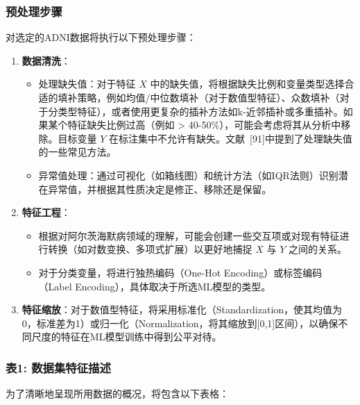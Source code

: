 \documentclass[12pt,a4paper]{article}
\begin{document}
\subsubsection{预处理步骤}
\label{sec:preprocessing_steps}
对选定的ADNI数据将执行以下预处理步骤：
\begin{enumerate}
    \item \textbf{数据清洗}：
    \begin{itemize}
        \item 处理缺失值：对于特征 $X$ 中的缺失值，将根据缺失比例和变量类型选择合适的填补策略，例如均值/中位数填补（对于数值型特征）、众数填补（对于分类型特征），或者使用更复杂的插补方法如k-近邻插补或多重插补。如果某个特征缺失比例过高（例如 > 40-50\%），可能会考虑将其从分析中移除。目标变量 $Y$ 在标注集中不允许有缺失。文献~{[91]}中提到了处理缺失值的一些常见方法。
        \item 异常值处理：通过可视化（如箱线图）和统计方法（如IQR法则）识别潜在异常值，并根据其性质决定是修正、移除还是保留。
    \end{itemize}
    \item \textbf{特征工程}：
    \begin{itemize}
        \item 根据对阿尔茨海默病领域的理解，可能会创建一些交互项或对现有特征进行转换（如对数变换、多项式扩展）以更好地捕捉 $X$ 与 $Y$ 之间的关系。
        \item 对于分类变量，将进行独热编码（One-Hot Encoding）或标签编码（Label Encoding），具体取决于所选ML模型的类型。
    \end{itemize}
    \item \textbf{特征缩放}：对于数值型特征，将采用标准化（Standardization，使其均值为0，标准差为1）或归一化（Normalization，将其缩放到[0,1]区间），以确保不同尺度的特征在ML模型训练中得到公平对待。
\end{enumerate}

\subsubsection{表1: 数据集特征描述}
\label{sec:table1_dataset_description}
为了清晰地呈现所用数据的概况，将包含以下表格：
\end{document}
